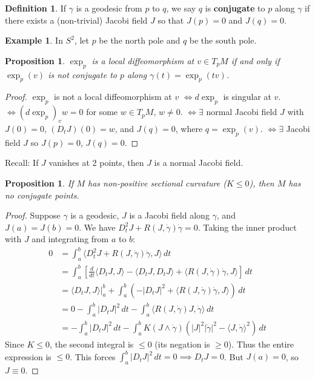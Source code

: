 \documentclass[11pt, a4paper]{article}
\theoremstyle{plain}
\newtheorem{proposition}[theorem]{Proposition}
\theoremstyle{definition}
\newtheorem{definition}[theorem]{Definition}
\newtheorem{example}[theorem]{Example}
\theoremstyle{remark}
\begin{document}
{\begin{definition}
If $\gamma$ is a geodesic from $p$ to $q$, we say $q$ is \textbf{conjugate} to $p$ along $\gamma$ if there exists a (non-trivial) Jacobi field $J$ so that $J(p) = 0$ and $J(q) = 0$.
\end{definition}

\begin{example}
In $S^2$, let $p$ be the north pole and $q$ be the south pole.
\end{example}

\begin{proposition}
$\exp_p$ is a local diffeomorphism at $v \in T_pM$ if and only if $\exp_p(v)$ is not conjugate to $p$ along $\gamma(t) = \exp_p(tv)$.
\end{proposition}

\begin{proof}
$\exp_p$ is not a local diffeomorphism at $v$
$\iff d\exp_p$ is singular at $v$.
$\iff (d\exp_p)_v w = 0$ for some $w \in T_pM$, $w \neq 0$.
$\iff \exists$ normal Jacobi field $J$ with $J(0) = 0$, $(D_t J)(0) = w$, and $J(q) = 0$, where $q = \exp_p(v)$.
$\iff \exists$ Jacobi field $J$ so $J(p) = 0$, $J(q) = 0$.
\end{proof}

Recall: If $J$ vanishes at 2 points, then $J$ is a normal Jacobi field.

\begin{proposition}
If $M$ has non-positive sectional curvature ($K \le 0$), then $M$ has no conjugate points.
\end{proposition}

\begin{proof}
Suppose $\gamma$ is a geodesic, $J$ is a Jacobi field along $\gamma$, and $J(a) = J(b) = 0$.
We have $D_t^2 J + R(J, \dot{\gamma})\dot{\gamma} = 0$.
Taking the inner product with $J$ and integrating from $a$ to $b$:
\begin{align*}
0 &= \int_a^b \langle D_t^2 J + R(J, \dot{\gamma})\dot{\gamma}, J \rangle \, dt \\
&= \int_a^b \left[ \frac{d}{dt} \langle D_t J, J \rangle - \langle D_t J, D_t J \rangle + \langle R(J, \dot{\gamma})\dot{\gamma}, J \rangle \right] \, dt \\
&= \langle D_t J, J \rangle \Big|_a^b + \int_a^b \left( -|D_t J|^2 + \langle R(J, \dot{\gamma})\dot{\gamma}, J \rangle \right) \, dt \\
&= 0 - \int_a^b |D_t J|^2 \, dt - \int_a^b \langle R(J, \dot{\gamma})J, \dot{\gamma} \rangle \, dt \\
&= - \int_a^b |D_t J|^2 \, dt - \int_a^b K(J \wedge \dot{\gamma}) \left( |J|^2 |\dot{\gamma}|^2 - \langle J, \dot{\gamma} \rangle^2 \right) \, dt
\end{align*}
Since $K \le 0$, the second integral is $\le 0$ (its negation is $\ge 0$). Thus the entire expression is $\le 0$.
This forces $\int_a^b |D_t J|^2 \, dt = 0 \implies D_t J = 0$. But $J(a) = 0$, so $J \equiv 0$.
\end{proof}

}
\end{document}

